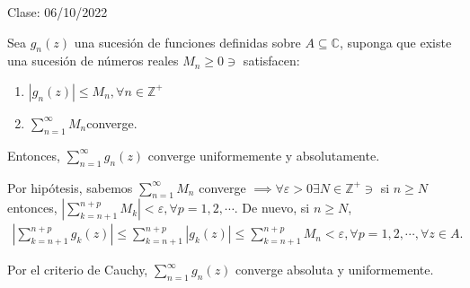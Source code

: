 Clase: 06/10/2022

\begin{teorema}
    Sea $g_n(z)$ una sucesión de funciones definidas sobre $A\subseteq \mathbb{C}$, suponga que existe una sucesión de números reales $M_n\geq 0\ni$ satisfacen:
    \begin{enumerate}
        \item $|g_n(z)|\leq M_n,\forall n\in \mathbb{Z}^+$
        \item $\sum_{n=1}^{\infty}M_n$converge. 
    \end{enumerate}
    Entonces, $\sum_{n=1}^{\infty}g_n(z)$ converge uniformemente y absolutamente. 
    \begin{dem}
        Por hipótesis, sabemos $\sum_{n=1}^{\infty}M_n$ converge $\implies \forall\varepsilon>0\exists N\in\mathbb{Z}^+\ni$ si $n\geq N$ entonces, $|\sum_{k=n+1}^{n+p}M_k|<\varepsilon,\forall p=1,2,\cdots .$ De nuevo, si $n\geq N$, 
        \begin{align*}
            \left|\sum_{k=n+1}^{n+p}g_k(z)\right|\leq \sum_{k=n+1}^{n+p}|g_k(z)|\leq \sum_{k=n+1}^{n+p}M_n<\varepsilon,\forall p=1,2,\cdots, \forall z\in A.
        \end{align*}

        Por el criterio de Cauchy, $\sum_{n=1}^\infty g_n(z)$ converge absoluta y uniformemente. 
    \end{dem}
\end{teorema}

